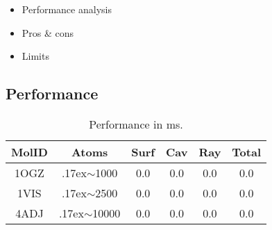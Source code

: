 \begin{itemize}
  \item Performance analysis
  \item Pros \& cons
  \item Limits
\end{itemize}

\def\tweakedsim{\raise.17ex\hbox{$\scriptstyle\sim$}}

\subsection{Performance}
\label{sec:performance}

\begin{table}
  \caption{Performance in ms.}
  \label{tab:performance}
  \scriptsize
  \begin{center}
    \begin{tabular}{cccccc}
      MolID & Atoms & Surf & Cav & Ray & Total \\
    \hline
      1OGZ &  {\tweakedsim}1000 & 0.0 & 0.0 & 0.0 & 0.0 \\
      1VIS &  {\tweakedsim}2500 & 0.0 & 0.0 & 0.0 & 0.0 \\
      4ADJ & {\tweakedsim}10000 & 0.0 & 0.0 & 0.0 & 0.0
    \end{tabular}
  \end{center}
\end{table}
